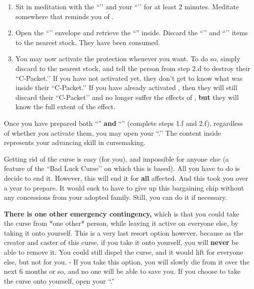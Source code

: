 \documentclass[green]{GL2020}
\begin{document}
\begin{enumerate}
\begin{enumerate}
    \item Sit in meditation with the ``\iSlowActingPoisonCure{}’’ and your ``\iWIPProtection{}’’ for at least 2 minutes. Meditate somewhere that reminds you of \cFarmGod{}.
    \item Open the ``\iWIPProtection{}’’ envelope and retrieve the ``\iProtection{}'' inside. Discard the ``\iSlowActingPoisonCure{}’’ and ``\iWIPProtection{}’’ items to the nearest stock. They have been consumed.
    \item  You may now activate the protection whenever you want. To do so, simply discard \iProtection{} to the nearest stock, and tell the person from step 2.d to destroy their ``C-Packet.’’ If you have not activated \iWithering{} yet, they don’t get to know what was inside their ``C-Packet.’’ If you have already activated \iWithering{}, then they will still discard their ``C-Packet’’ and no longer suffer the effects of \iWithering{}, \textbf{but} they will know the full extent of the effect.
  \end{enumerate}
\end{enumerate}

Once you have prepared both ``\iWithering{}'' \textbf{and} ``\iProtection{}'' (complete steps 1.f and 2.f), regardless of whether you activate them, you may open your ``\mPacketThree{}.’’ The content inside represents your advancing skill in cursemaking.

Getting rid of the curse is easy (for you), and impossible for anyone else (a feature of the ``Bad Luck Curse’’ on which this is based). All you have to do is decide to end it. However, this will end it for \textbf{all} affected. And this took you over a year to prepare. It would suck to have to give up this bargaining chip without any concessions from your adopted family. Still, you can do it if necessary.

\textbf{There is one other emergency contingency,} which is that you could take the curse from *one other* person, while leaving it active on everyone else, by taking it onto yourself. This is a very last resort option however, because as the creator and caster of this curse, if you take it onto yourself, you will \textbf{never} be able to remove it. You could still dispel the curse, and it would lift for everyone else, but not for you. - If you take this option, you will slowly die from it over the next 6 months or so, and no one will be able to save you. If you choose to take the curse onto yourself, open your ``\mCPrimePacket{\MYname}.''
\end{document}

